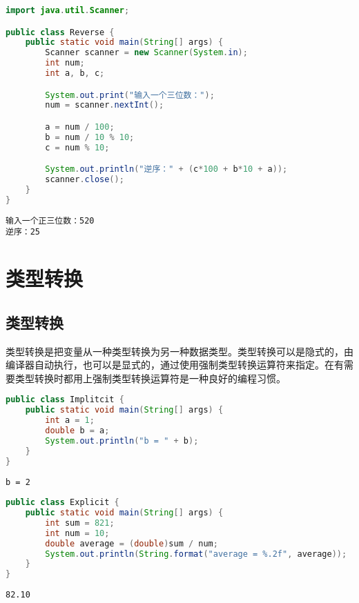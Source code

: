
\begin{lstlisting}[language=Java]
import java.util.Scanner;

public class Reverse {
	public static void main(String[] args) {
		Scanner scanner = new Scanner(System.in);
		int num;
		int a, b, c;

		System.out.print("输入一个三位数：");
		num = scanner.nextInt();

		a = num / 100;
		b = num / 10 % 10;
		c = num % 10;

		System.out.println("逆序：" + (c*100 + b*10 + a));
		scanner.close();
	}
}
\end{lstlisting}

\begin{tcolorbox}
	\begin{verbatim}
输入一个正三位数：520
逆序：25
	\end{verbatim}
\end{tcolorbox}

\newpage

\section{类型转换}

\subsection{类型转换}

类型转换是把变量从一种类型转换为另一种数据类型。类型转换可以是隐式的，由编译器自动执行，也可以是显式的，通过使用强制类型转换运算符来指定。在有需要类型转换时都用上强制类型转换运算符是一种良好的编程习惯。 \\

\begin{lstlisting}[language=Java]
public class Implitcit {
	public static void main(String[] args) {
		int a = 1;
		double b = a;
		System.out.println("b = " + b);
	}
}
\end{lstlisting}

\begin{tcolorbox}
	\begin{verbatim}
b = 2
	\end{verbatim}
\end{tcolorbox}

\vspace{0.5cm}


\begin{lstlisting}[language=Java]
public class Explicit {
	public static void main(String[] args) {
		int sum = 821;
		int num = 10;
		double average = (double)sum / num;
		System.out.println(String.format("average = %.2f", average));
	}
}
\end{lstlisting}

\begin{tcolorbox}
	\begin{verbatim}
82.10
	\end{verbatim}
\end{tcolorbox}

\newpage